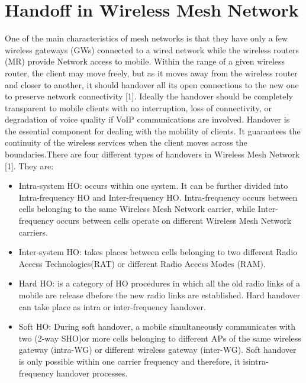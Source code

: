 \documentclass[12pt,a4paper]{report}
\begin{document}
\section{Handoff in Wireless Mesh Network}
One of the main characteristics of mesh networks is that they have only a few wireless gateways (GWs) connected to a wired network while the wireless routers (MR) provide Network access to mobile. Within the range of a given wireless router, the client may move freely, but as it moves away from the wireless router and closer to another, it should handover all its open connections to the new one to preserve network connectivity [1]. Ideally the handover should be completely transparent to mobile clients with no interruption, loss of connectivity, or degradation of voice quality if VoIP communications are involved. Handover is the essential component for dealing with the mobility of clients. It guarantees the continuity of the wireless services when the client moves across the boundaries.There are four different types of handovers in Wireless Mesh Network [1]. They are:
\begin{itemize}
\item 
Intra-system HO: occurs within one system. It can be further divided into Intra-frequency HO and Inter-frequency HO. Intra-frequency occurs between cells belonging to the same Wireless Mesh Network carrier, while Inter-frequency occurs between cells operate on different Wireless Mesh Network carriers.
\item 
Inter-system HO: takes places between cells belonging to two different Radio Access Technologies(RAT) or different Radio Access Modes (RAM).
\item 
Hard HO: is a category of HO procedures in which all the old radio links of a mobile are release dbefore the new radio links are established. Hard handover can take place as intra or inter-frequency handover.
\item 
Soft HO: During soft handover, a mobile simultaneously communicates with two (2-way SHO)or more cells belonging to different APs of the same wireless gateway (intra-WG) or different wireless gateway (inter-WG). Soft handover is only possible within one carrier frequency and therefore, it isintra-frequency handover processes.
\end{itemize}
\end{document}
